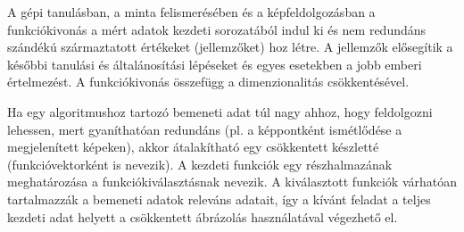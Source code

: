 




A gépi tanulásban, a minta felismerésében és a képfeldolgozásban a funkciókivonás a mért adatok kezdeti sorozatából indul ki és nem redundáns szándékú származtatott értékeket (jellemzőket) hoz létre. A jellemzők elősegítik a későbbi tanulási és általánosítási lépéseket és egyes esetekben a jobb emberi értelmezést. A funkciókivonás\cite{features27:online} összefügg a dimenzionalitás csökkentésével.

Ha egy algoritmushoz tartozó bemeneti adat túl nagy ahhoz, hogy feldolgozni lehessen, mert gyaníthatóan redundáns (pl. a képpontként ismétlődése a megjelenített képeken), akkor átalakítható egy csökkentett készletté (funkcióvektorként is nevezik). A kezdeti funkciók egy részhalmazának meghatározása a funkciókiválasztásnak nevezik. A kiválasztott funkciók várhatóan tartalmazzák a bemeneti adatok releváns adatait, így a kívánt feladat a teljes kezdeti adat helyett a csökkentett ábrázolás használatával végezhető el.

